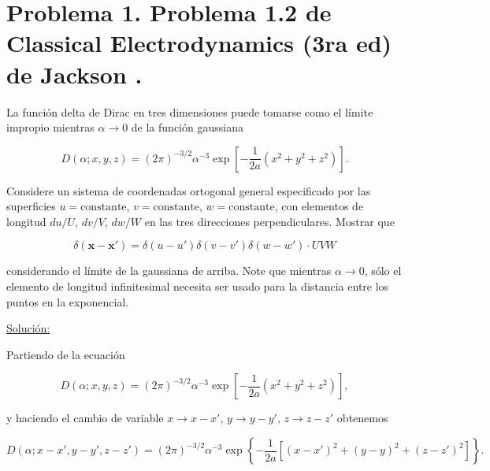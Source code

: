 \documentclass[a4paper,11pt]{article}
\numberwithin{equation}{section}
\renewcommand{\thefootnote}{\fnsymbol{footnote}}
\begin{document}

\fancyhead[R]{\thepage}

\setcounter{footnote}{0}
\renewcommand*{\thefootnote}{\arabic{footnote}}

\section{Problema 1. Problema 1.2 de Classical Electrodynamics (3ra ed) de 
Jackson \cite{jackson}.}

La función delta de Dirac en tres dimensiones puede tomarse como el límite impropio 
mientras $\alpha \rightarrow 0$ de la función gaussiana 

$$
D(\alpha;x,y,z) = (2\pi)^{-3/2}\alpha^{-3}\exp\left[-\frac{1}{2a}(x^2 + y^2 + z^2) \right].
$$

Considere un sistema de coordenadas ortogonal general especificado por las superficies 
$u = \text{constante}$, $v = \text{constante}$, $w = \text{constante}$, con elementos 
de longitud $du/U$, $dv/V$, $dw/W$ en las tres direcciones perpendiculares. Mostrar 
que

$$
\delta(\mathbf{x} - \mathbf{x}') = \delta(u - u')\delta(v - v')\delta(w - w')\cdot UVW
$$

considerando el límite de la gaussiana de arriba. Note que mientras $\alpha \rightarrow 
0$, sólo el elemento de longitud infinitesimal necesita ser usado para la distancia
entre los puntos en la exponencial.

\vspace{.3cm}

\underline{Solución:} \vspace{.3cm}

Partiendo de la ecuación 

\begin{equation}
 D(\alpha;x,y,z) = (2\pi)^{-3/2}\alpha^{-3}
 \exp\left[-\frac{1}{2a}(x^2 + y^2 + z^2) \right],
\end{equation}

y haciendo el cambio de variable $x \rightarrow x-x'$, $y \rightarrow y-y'$, 
$z \rightarrow z-z'$ obtenemos 

\begin{equation*}
 D(\alpha;x-x',y-y',z-z') = (2\pi)^{-3/2}\alpha^{-3}
 \exp\left\{-\frac{1}{2a}[(x-x')^2 + (y-y)^2 + (z-z')^2] \right\}.
\end{equation*}
\end{document}
